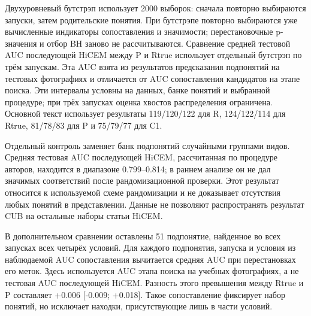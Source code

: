Двухуровневый бутстрэп использует 2000 выборок: сначала повторно выбираются запуски, затем родительские понятия. При бутстрэпе повторно выбираются уже вычисленные индикаторы сопоставления и значимости; перестановочные p-значения и отбор BH заново не рассчитываются. Сравнение средней тестовой AUC последующей HiCEM между P и Rtrue использует отдельный бутстрэп по трём запускам. Эта AUC взята из результатов предсказания подпонятий на тестовых фотографиях и отличается от AUC сопоставления кандидатов на этапе поиска. Эти интервалы условны на данных, банке понятий и выбранной процедуре; при трёх запусках оценка хвостов распределения ограничена. Основной текст использует результаты 119/120/122 для R, 124/122/114 для Rtrue, 81/78/83 для P и 75/79/77 для C1.

Отдельный контроль заменяет банк подпонятий случайными группами видов. Средняя тестовая AUC последующей HiCEM, рассчитанная по процедуре авторов, находится в диапазоне 0.799–0.814; в раннем анализе он не дал значимых соответствий после рандомизационной проверки. Этот результат относится к используемой схеме рандомизации и не доказывает отсутствия любых понятий в представлении. Данные не позволяют распространять результат CUB на остальные наборы статьи HiCEM.


В дополнительном сравнении оставлены 51 подпонятие, найденное во всех запусках всех четырёх условий. Для каждого подпонятия, запуска и условия из наблюдаемой AUC сопоставления вычитается средняя AUC при перестановках его меток. Здесь используется AUC этапа поиска на учебных фотографиях, а не тестовая AUC последующей HiCEM. Разность этого превышения между Rtrue и P составляет +0.006 [-0.009; +0.018]. Такое сопоставление фиксирует набор понятий, но исключает находки, присутствующие лишь в части условий.
